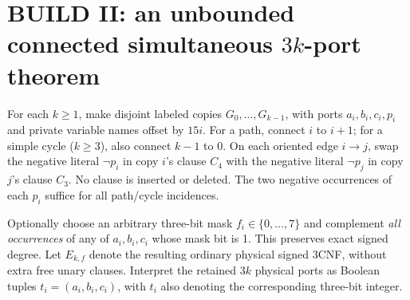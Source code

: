 \documentclass[11pt]{article}
\begin{document}
\section{BUILD II: an unbounded connected simultaneous $3k$-port theorem}
For each $k\ge1$, make disjoint labeled copies $G_0,\dots,G_{k-1}$, with ports $a_i,b_i,c_i,p_i$ and private variable names offset by $15i$. For a path, connect $i$ to $i+1$; for a simple cycle ($k\ge3$), also connect $k-1$ to $0$. On each oriented edge $i\to j$, swap the negative literal $\neg p_i$ in copy $i$'s clause $C_4$ with the negative literal $\neg p_j$ in copy $j$'s clause $C_3$. No clause is inserted or deleted. The two negative occurrences of each $p_i$ suffice for all path/cycle incidences.

Optionally choose an arbitrary three-bit mask $f_i\in\{0,\ldots,7\}$ and complement \emph{all occurrences} of any of $a_i,b_i,c_i$ whose mask bit is 1. This preserves exact signed degree. Let $E_{k,f}$ denote the resulting ordinary physical signed 3CNF, without extra free unary clauses. Interpret the retained $3k$ physical ports as Boolean tuples $t_i=(a_i,b_i,c_i)$, with $t_i$ also denoting the corresponding three-bit integer.
\end{document}
